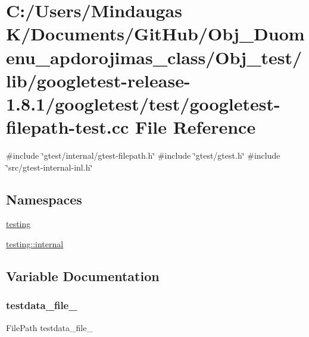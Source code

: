 \hypertarget{_obj__test_2lib_2googletest-release-1_88_81_2googletest_2test_2googletest-filepath-test_8cc}{}\section{C\+:/\+Users/\+Mindaugas K/\+Documents/\+Git\+Hub/\+Obj\+\_\+\+Duomenu\+\_\+apdorojimas\+\_\+class/\+Obj\+\_\+test/lib/googletest-\/release-\/1.8.1/googletest/test/googletest-\/filepath-\/test.cc File Reference}
\label{_obj__test_2lib_2googletest-release-1_88_81_2googletest_2test_2googletest-filepath-test_8cc}
{\ttfamily \#include \char`\"{}gtest/internal/gtest-\/filepath.\+h\char`\"{}}\newline
{\ttfamily \#include \char`\"{}gtest/gtest.\+h\char`\"{}}\newline
{\ttfamily \#include \char`\"{}src/gtest-\/internal-\/inl.\+h\char`\"{}}\newline
\subsection*{Namespaces}
\begin{DoxyCompactItemize}
\item 
 \mbox{\hyperlink{namespacetesting}{testing}}
\item 
 \mbox{\hyperlink{namespacetesting_1_1internal}{testing\+::internal}}
\end{DoxyCompactItemize}


\subsection{Variable Documentation}
\mbox{\label{_obj__test_2lib_2googletest-release-1_88_81_2googletest_2test_2googletest-filepath-test_8cc_ab25205b360de0f1648175ccbc1cc4365}} 
\subsubsection{\texorpdfstring{testdata\_file\_}{testdata\_file\_}}
{\footnotesize\ttfamily File\+Path testdata\+\_\+file\+\_\+\hspace{0.3cm}{\ttfamily [protected]}}

